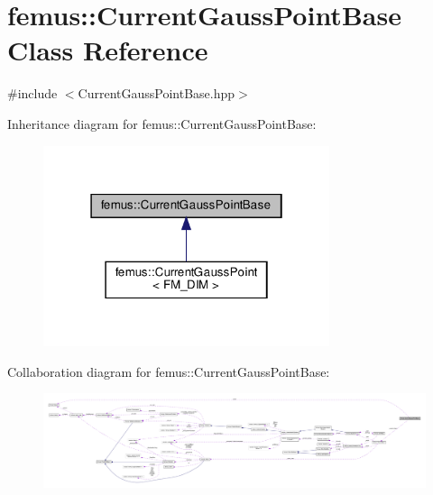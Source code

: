 \hypertarget{classfemus_1_1_current_gauss_point_base}{}\section{femus\+:\+:Current\+Gauss\+Point\+Base Class Reference}
\label{classfemus_1_1_current_gauss_point_base}


{\ttfamily \#include $<$Current\+Gauss\+Point\+Base.\+hpp$>$}



Inheritance diagram for femus\+:\+:Current\+Gauss\+Point\+Base\+:
\nopagebreak
\begin{figure}[H]
\begin{center}
\leavevmode
\includegraphics[width=238pt]{classfemus_1_1_current_gauss_point_base__inherit__graph}
\end{center}
\end{figure}


Collaboration diagram for femus\+:\+:Current\+Gauss\+Point\+Base\+:
\nopagebreak
\begin{figure}[H]
\begin{center}
\leavevmode
\includegraphics[width=350pt]{classfemus_1_1_current_gauss_point_base__coll__graph}
\end{center}
\end{figure}
